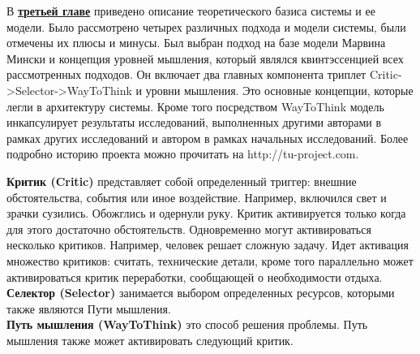 \clearpage
В \underline{\textbf{третьей главе}} приведено описание теоретического базиса системы и ее модели. Было рассмотрено четырех различных подхода и модели системы, были отмечены их плюсы и минусы. Был выбран подход на базе модели Марвина Мински и концепция уровней мышления, который являлся квинтэссенцией всех рассмотренных подходов. Он включает два главных компонента триплет Critic->Selector->WayToThink и уровни мышления. Это основные концепции, которые легли в архитектуру системы. Кроме того посредством WayToThink модель инкапсулирует результаты исследований, выполненных другими авторами в рамках других исследований и автором в рамках начальных исследований. Более подробно историю проекта можно прочитать на http://tu-project.com. 


\textbf{Критик (Critic)} представляет собой определенный триггер: внешние обстоятельства, события или иное воздействие. Например, включился свет и зрачки сузились. Обожглись и одернули руку. Критик активируется только когда для этого достаточно обстоятельств. Одновременно могут активироваться несколько критиков. Например, человек решает сложную задачу. Идет активация множество критиков: считать, технические детали, кроме того параллельно может активироваться критик переработки, сообщающей о необходимости отдыха.\\
\textbf{Селектор (Selector)} занимается выбором определенных ресурсов, которыми также являются Пути мышления. \\
\textbf{Путь мышления (WayToThink)} это способ решения проблемы. Путь мышления также может активировать следующий критик. \\

